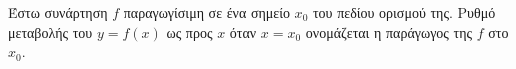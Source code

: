Έστω συνάρτηση $ f $ παραγωγίσιμη σε ένα σημείο $ x_0 $ του πεδίου ορισμού της. Ρυθμό μεταβολής του $ y=f(x) $ ως προς $ x $ όταν $ x=x_0 $ ονομάζεται η παράγωγος της $ f $ στο $ x_0 $.
